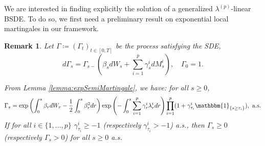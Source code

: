 \documentclass[11pt,a4paper]{article}
\numberwithin{equation}{section}
\theoremstyle{newPlain}
\theoremstyle{newDefinition}
\theoremstyle{newRemark}
\newtheorem{remark}[theorem]{Remark}
\begin{document}
{We are interested in finding explicitly the solution of a generalized $\lambda^{(p)}$-linear BSDE. To do so, we first need a preliminary result on exponential local martingales in our framework.

\begin{remark}\label{remark:2.12}
 Let $\Gamma\coloneqq(\Gamma_t)_{t\in[0,T]}$ be the process satisfying the SDE,
    \begin{equation}\label{eq:defESpDefault}
        d\Gamma_s = \Gamma_{s-}(\beta_sdW_s + \sum_{i=1}^p\gamma_s^idM_s^i),\quad\Gamma_0=1.
    \end{equation}

    From Lemma \ref{lemma:expSemiMartingale}, we have: for all $s\ge0$,
    \begin{equation}\label{eq:defESpDefault2}
        \Gamma_s = \exp\left(\int_0^s\beta_rdW_r - \frac{1}{2}\int_0^s\beta_r^2dr\right)\exp\left(-\int_0^s\sum_{i=1}^p\gamma_r^i\lambda_r^idr\right)\prod_{i=1}^p(1+\gamma_{\tau_i}^i\mathbbm{1}_{\{s\ge\tau_i\}}),\text{  a.s.}
    \end{equation}
    If for all $i\in\{1,\ldots,p\}$  $\gamma_{\tau_i}^i\ge-1$ (respectively $\gamma_{\tau_i}^i>-1$) a.s., then $\Gamma_s\ge0$ (respectively $\Gamma_s>0$) for all $s\ge0$ a.s.
\end{remark}

}
\end{document}
